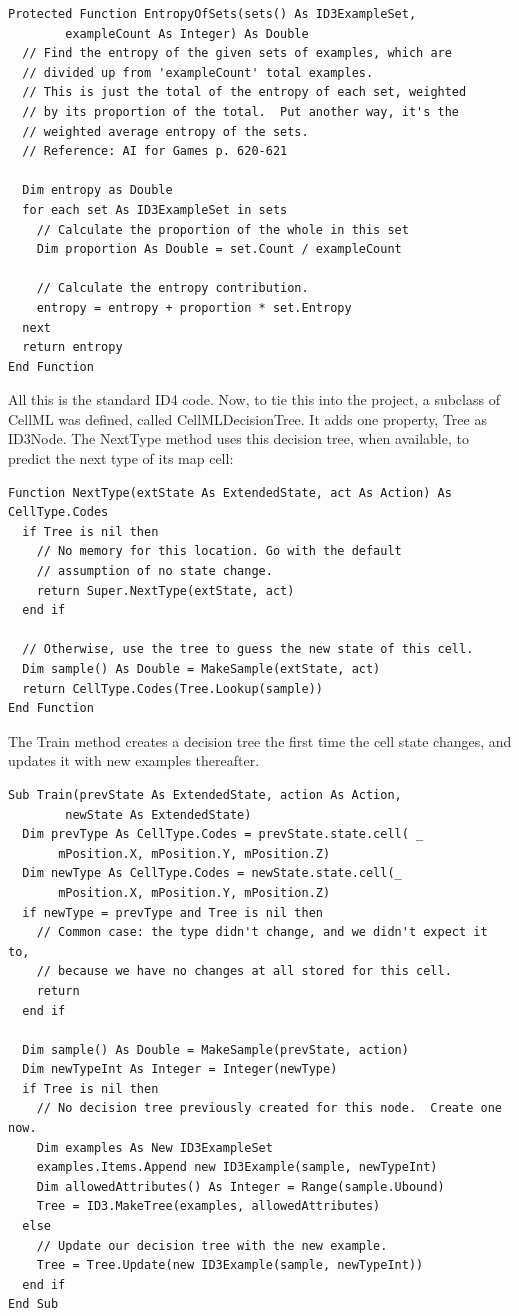 \documentclass{article}
\begin{document}
\begin{lstlisting}
Protected Function EntropyOfSets(sets() As ID3ExampleSet, 
        exampleCount As Integer) As Double
  // Find the entropy of the given sets of examples, which are 
  // divided up from 'exampleCount' total examples.
  // This is just the total of the entropy of each set, weighted
  // by its proportion of the total.  Put another way, it's the 
  // weighted average entropy of the sets.
  // Reference: AI for Games p. 620-621
  
  Dim entropy as Double
  for each set As ID3ExampleSet in sets
    // Calculate the proportion of the whole in this set
    Dim proportion As Double = set.Count / exampleCount
    
    // Calculate the entropy contribution.
    entropy = entropy + proportion * set.Entropy
  next  
  return entropy  
End Function
\end{lstlisting}

All this is the standard ID4 code.  Now, to tie this into the project, a subclass of CellML was defined, called CellMLDecisionTree.  It adds one property, Tree as ID3Node.  The NextType method uses this decision tree, when available, to predict the next type of its map cell:

\begin{lstlisting}
Function NextType(extState As ExtendedState, act As Action) As CellType.Codes
  if Tree is nil then
    // No memory for this location. Go with the default
    // assumption of no state change.
    return Super.NextType(extState, act)
  end if
  
  // Otherwise, use the tree to guess the new state of this cell.
  Dim sample() As Double = MakeSample(extState, act)
  return CellType.Codes(Tree.Lookup(sample))
End Function
\end{lstlisting}

The Train method creates a decision tree the first time the cell state changes, and updates it with new examples thereafter.

\begin{lstlisting}
Sub Train(prevState As ExtendedState, action As Action, 
        newState As ExtendedState)
  Dim prevType As CellType.Codes = prevState.state.cell( _
       mPosition.X, mPosition.Y, mPosition.Z)
  Dim newType As CellType.Codes = newState.state.cell(_
       mPosition.X, mPosition.Y, mPosition.Z)
  if newType = prevType and Tree is nil then
    // Common case: the type didn't change, and we didn't expect it to,
    // because we have no changes at all stored for this cell.
    return
  end if
  
  Dim sample() As Double = MakeSample(prevState, action)
  Dim newTypeInt As Integer = Integer(newType)
  if Tree is nil then
    // No decision tree previously created for this node.  Create one now.
    Dim examples As New ID3ExampleSet
    examples.Items.Append new ID3Example(sample, newTypeInt)
    Dim allowedAttributes() As Integer = Range(sample.Ubound)
    Tree = ID3.MakeTree(examples, allowedAttributes)
  else
    // Update our decision tree with the new example.
    Tree = Tree.Update(new ID3Example(sample, newTypeInt))
  end if
End Sub
\end{lstlisting}
\end{document}
